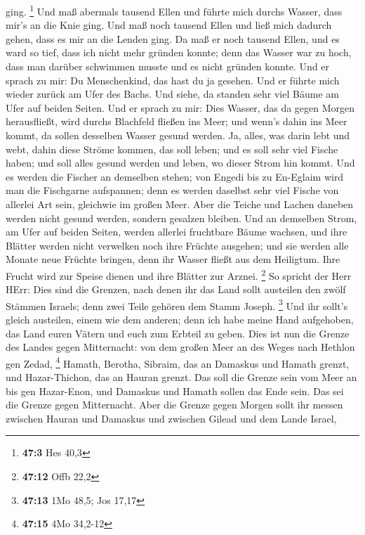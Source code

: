 ging. \footnote{\textbf{47:3} Hes 40,3}  Und maß abermals
tausend Ellen und führte mich durchs Wasser, dass mir's an die Knie
ging. Und maß noch tausend Ellen und ließ mich dadurch gehen, dass es
mir an die Lenden ging.  Da maß er noch tausend Ellen, und
es ward so tief, dass ich nicht mehr gründen konnte; denn das Wasser war
zu hoch, dass man darüber schwimmen musste und es nicht gründen konnte.
 Und er sprach zu mir: Du Menschenkind, das hast du ja
gesehen. Und er führte mich wieder zurück am Ufer des Bachs.
 Und siehe, da standen sehr viel Bäume am Ufer auf beiden
Seiten.  Und er sprach zu mir: Dies Wasser, das da gegen
Morgen herausfließt, wird durchs Blachfeld fließen ins Meer; und wenn's
dahin ins Meer kommt, da sollen desselben Wasser gesund werden.
 Ja, alles, was darin lebt und webt, dahin diese Ströme
kommen, das soll leben; und es soll sehr viel Fische haben; und soll
alles gesund werden und leben, wo dieser Strom hin kommt. 
Und es werden die Fischer an demselben stehen; von Engedi bis zu
En-Eglaim wird man die Fischgarne aufspannen; denn es werden daselbst
sehr viel Fische von allerlei Art sein, gleichwie im großen Meer.
 Aber die Teiche und Lachen daneben werden nicht gesund
werden, sondern gesalzen bleiben.  Und an demselben Strom,
am Ufer auf beiden Seiten, werden allerlei fruchtbare Bäume wachsen, und
ihre Blätter werden nicht verwelken noch ihre Früchte ausgehen; und sie
werden alle Monate neue Früchte bringen, denn ihr Wasser fließt aus dem
Heiligtum. Ihre Frucht wird zur Speise dienen und ihre Blätter zur
Arznei. \footnote{\textbf{47:12} Offb 22,2}  So spricht der
Herr HErr: Dies sind die Grenzen, nach denen ihr das Land sollt
austeilen den zwölf Stämmen Israels; denn zwei Teile gehören dem Stamm
Joseph. \footnote{\textbf{47:13} 1Mo 48,5; Jos 17,17}  Und
ihr sollt's gleich austeilen, einem wie dem anderen; denn ich habe meine
Hand aufgehoben, das Land euren Vätern und euch zum Erbteil zu geben.
 Dies ist nun die Grenze des Landes gegen Mitternacht: von
dem großen Meer an des Weges nach Hethlon gen Zedad, \footnote{\textbf{47:15}
  4Mo 34,2-12}  Hamath, Berotha, Sibraim, das an Damaskus
und Hamath grenzt, und Hazar-Thichon, das an Hauran grenzt.
 Das soll die Grenze sein vom Meer an bis gen Hazar-Enon,
und Damaskus und Hamath sollen das Ende sein. Das sei die Grenze gegen
Mitternacht.  Aber die Grenze gegen Morgen sollt ihr messen
zwischen Hauran und Damaskus und zwischen Gilead und dem Lande Israel,
